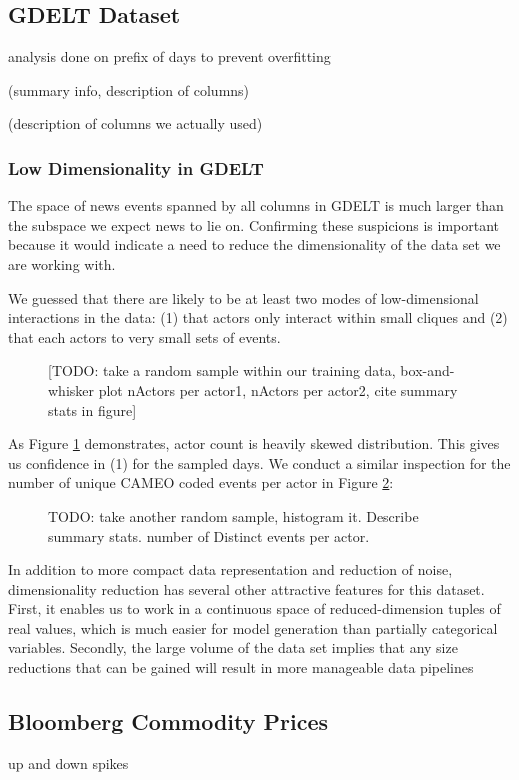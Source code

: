 
\subsection{GDELT Dataset}

analysis done on prefix of days to prevent overfitting \cite{leetaru2013gdelt}

(summary info, description of columns)

(description of columns we actually used)

\subsubsection{Low Dimensionality in GDELT}

The space of news events spanned by all columns in GDELT is much larger than the subspace we expect news to lie on. Confirming these suspicions is important because it would indicate a need to reduce the dimensionality of the data set we are working with.

We guessed that there are likely to be at least two modes of low-dimensional interactions in the data: (1) that actors only interact within small cliques and (2) that each actors to very small sets of events.

\begin{figure}[h]
\centering
\caption{[TODO: take a random sample within our training data, box-and-whisker plot nActors per actor1, nActors per actor2, cite summary stats in figure]
\label{fig:actors-per-actor}}
\end{figure}

As Figure \ref{fig:actors-per-actor} demonstrates, actor count is heavily skewed distribution. This gives us confidence in (1) for the sampled days. We conduct a similar inspection for the number of unique CAMEO coded events per actor in Figure \ref{fig:events-per-actor}:

\begin{figure}[h]
\centering
\caption{TODO: take another random sample, histogram it. Describe summary stats. number of Distinct events per actor.
\label{fig:events-per-actor}}
\end{figure}

In addition to more compact data representation and reduction of noise, dimensionality reduction has several other attractive features for this dataset. First, it enables us to work in a continuous space of reduced-dimension tuples of real values, which is much easier for model generation than partially categorical variables. Secondly, the large volume of the data set implies that any size reductions that can be gained will result in more manageable data pipelines

\subsection{Bloomberg Commodity Prices}

up and down spikes